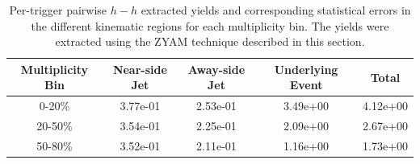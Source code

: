 \documentclass[ALICE,manyauthors]{ALICE_analysis_notes}
\begin{document}
\begin{table}[h!]
\centering
\begin{tabular}{| c || c | c | c | c | }
\hline
Multiplicity Bin & Near-side Jet & Away-side Jet & Underlying Event & Total  \\
\hline

0-20\% & 3.77e-01  & 2.53e-01  & 3.49e+00 & 4.12e+00 \\
20-50\% & 3.54e-01 & 2.25e-01  & 2.09e+00 & 2.67e+00 \\
50-80\% & 3.52e-01 & 2.11e-01  & 1.16e+00 & 1.73e+00 \\

\hline
\end{tabular}
\caption{Per-trigger pairwise $h-h$ extracted yields and corresponding statistical errors in the different kinematic regions for each multiplicity bin. The yields were extracted using the ZYAM technique described in this section.}
\label{h_h_yield_table_zyam}
\end{table}

\clearpage
\end{document}
